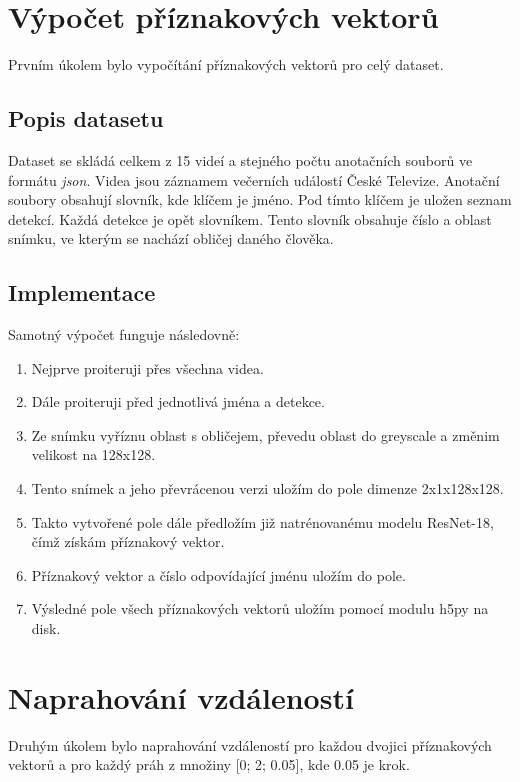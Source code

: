 \documentclass[11pt]{article}
\begin{document}
    \section{Výpočet příznakových vektorů}\label{sec:features}
    Prvním úkolem bylo vypočítání příznakových vektorů pro celý dataset.

    \subsection{Popis datasetu}\label{subsec:dataset}
    Dataset se skládá celkem z 15 videí a stejného počtu anotačních souborů ve formátu \textit{json}.
    Videa jsou záznamem večerních událostí České Televize.
    Anotační soubory obsahují slovník, kde klíčem je jméno.
    Pod tímto klíčem je uložen seznam detekcí.
    Každá detekce je opět slovníkem.
    Tento slovník obsahuje číslo a oblast snímku, ve kterým se nachází obličej daného člověka.

    \subsection{Implementace}\label{subsec:implementace}
    Samotný výpočet funguje následovně:
    \begin{enumerate}
        \item Nejprve proiteruji přes všechna videa.
        \item Dále proiteruji před jednotlivá jména a detekce.
        \item Ze snímku vyříznu oblast s obličejem, převedu oblast do greyscale a změnim velikost na 128x128.
        \item Tento snímek a jeho převrácenou verzi uložím do pole dimenze 2x1x128x128.
        \item Takto vytvořené pole dále předložím již natrénovanému modelu ResNet-18, čímž získám příznakový vektor.
        \item Příznakový vektor a číslo odpovídající jménu uložím do pole.
        \item Výsledné pole všech příznakových vektorů uložím pomocí modulu h5py na disk.
    \end{enumerate}

    \section{Naprahování vzdáleností}\label{sec:prahovani}
    Druhým úkolem bylo naprahování vzdáleností pro každou dvojici příznakových vektorů a pro každý práh z množiny
    [0; 2; 0.05], kde 0.05 je krok.
\end{document}
